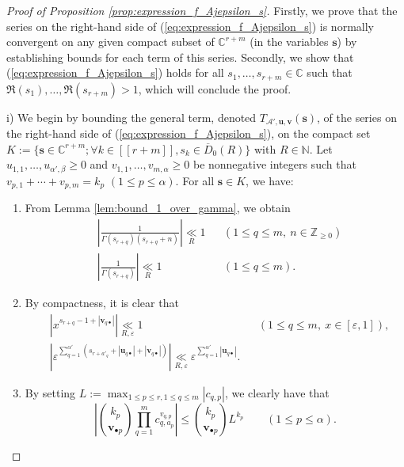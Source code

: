 \documentclass[10pt,a4paper]{amsart}
\begin{document}
\begin{proof}[Proof of Proposition \ref{prop:expression_f_Ajepsilon_s}]
Firstly, we prove that the series on the right-hand side of (\ref{eq:expression_f_Ajepsilon_s}) is normally convergent on any given compact subset of $\mathbb{C}^{r+m}$ (in the variables $\mathbf{s}$) by establishing bounds for each term of this series. Secondly, we show that (\ref{eq:expression_f_Ajepsilon_s}) holds for all $s_1,\ldots,s_{r+m} \in \mathbb{C}$ such that $\Re(s_1),\ldots,\Re(s_{r+m})>1$, which will conclude the proof.

i) We begin by bounding the general term, denoted $T_{\mathcal{A}',\mathbf{u},\mathbf{v}}(\mathbf{s})$, of the series on the right-hand side of (\ref{eq:expression_f_Ajepsilon_s}), on the compact set $K:=\{ \mathbf{s} \in \mathbb{C}^{r+m};\forall k \in [\![ r+m ]\!], s_k \in \overline{D}_0(R) \}$ with $R \in \mathbb{N}$. Let $u_{1,1},\ldots,u_{\alpha',\beta} \geq 0$ and $v_{1,1},\ldots,v_{m,\alpha} \geq 0$ be nonnegative integers such that $v_{p,1}+\cdots+v_{p,m}=k_p$ $(1 \leq p \leq \alpha)$. For all $\mathbf{s} \in K$, we have:
\begin{enumerate}
\item[$\bullet$] From Lemma \ref{lem:bound_1_over_gamma}, we obtain
\begin{align}
    & \left|\frac{1}{\Gamma(s_{r+q})(s_{r+q}+n)}\right| \underset{R}{\ll} 1 && (1 \leq q \leq m, \ n \in \mathbb{Z}_{\geq 0}) \label{eq:bound_gamma_inverse_uniform} \\
    & \left| \frac{1}{\Gamma(s_{r+q})} \right| \underset{R}{\ll} 1 && (1 \leq q \leq m). \label{eq:bound_gamma_inverse}
\end{align}

\item[$\bullet$] By compactness, it is clear that
\begin{align}
    &\left|x^{s_{r+q}-1+|\mathbf{v}_{q \bullet}|} \right| \underset{R,\varepsilon}{\ll} 1 && (1 \leq q \leq m, \ x \in [\varepsilon,1]), \label{eq:bound_x_power} \\
    &\left|\varepsilon^{\sum_{q=1}^{\alpha'} (s_{r+a'_q}+|\mathbf{u}_{q \bullet}|+|\mathbf{v}_{q \bullet}|)} \right| \underset{R,\varepsilon}{\ll} \varepsilon^{\sum_{q=1}^{\alpha'} |\mathbf{u}_{q \bullet}|}. \label{eq:bound_epsilon_power}
\end{align}

\item[$\bullet$] By setting $L:= \max_{1 \leq p \leq r, 1 \leq q \leq m} |c_{q,p}|$, we clearly have that 
\begin{equation}
    \left| \binom{k_p}{\mathbf{v}_{\bullet p}} \prod_{q=1}^m c_{q,a_p}^{v_{q,p}} \right| \leq \binom{k_p}{\mathbf{v}_{\bullet p}} L^{k_p} \qquad (1 \leq p \leq \alpha). \label{eq:bound_binomial}
\end{equation}


\end{enumerate}
\end{proof}
\end{document}
